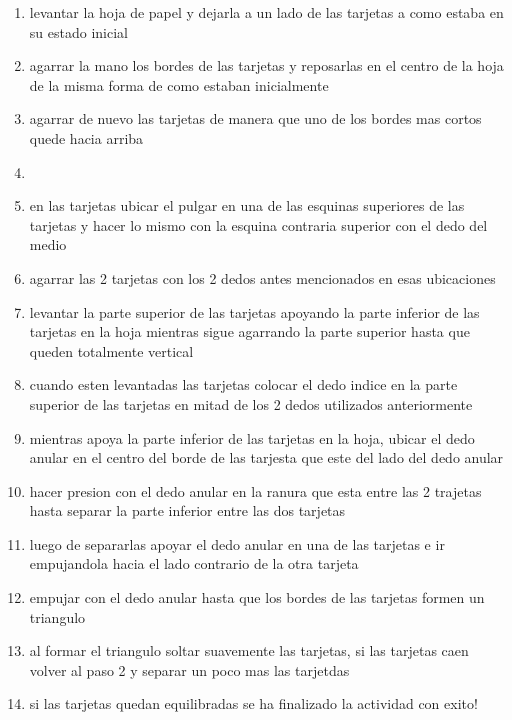 \documentclass{article}
\begin{document}
\begin{enumerate}
    \vspace{0.8cm}
    \item levantar la hoja de papel y dejarla a un lado de las tarjetas a como estaba en su estado inicial
    \item agarrar la mano los bordes de las tarjetas  y reposarlas en el centro de la hoja de la misma forma de como estaban inicialmente
    \item agarrar de nuevo las tarjetas de manera que uno de los bordes mas cortos quede hacia arriba
    \item 
    \item en las tarjetas ubicar el pulgar en una de las esquinas superiores de las tarjetas  y hacer lo mismo con la esquina contraria superior con el dedo del medio 
    \item agarrar las 2 tarjetas con los 2 dedos antes mencionados en esas ubicaciones 
    \item levantar la parte superior de las tarjetas apoyando la parte inferior de las tarjetas en la hoja mientras sigue agarrando la parte superior hasta que queden totalmente     vertical
    \item cuando esten levantadas las tarjetas colocar el dedo indice en la parte superior de las tarjetas en mitad de los 2 dedos utilizados anteriormente
    \item mientras apoya la parte inferior de las tarjetas en la hoja, ubicar el dedo anular en el centro del borde de las tarjesta que este del lado del dedo anular
    \item hacer presion con el dedo anular en la ranura  que esta entre las 2 trajetas hasta separar la parte inferior entre las dos tarjetas 
    \item luego de separarlas apoyar el dedo anular en una de las tarjetas e ir empujandola hacia el lado contrario de la otra tarjeta 
    \item empujar con el dedo anular hasta que los bordes de las tarjetas formen un triangulo 
    \item al formar el triangulo soltar suavemente las tarjetas, si las tarjetas caen volver al paso 2 y separar un poco mas las tarjetdas
    \item si las tarjetas quedan equilibradas se ha finalizado la actividad con exito!
\end{enumerate}
\end{document}
